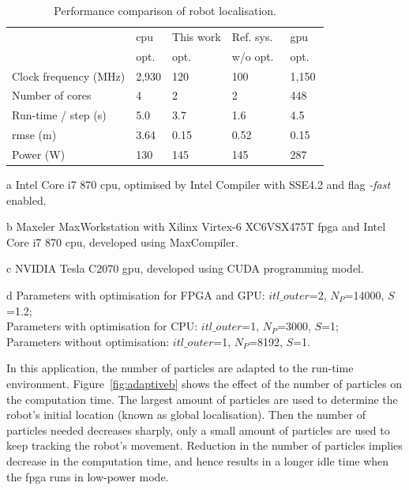 \begin{table}[ht]
	\setlength{\tabcolsep}{2pt}
	\begin{spacing}{1.0}
	\caption{Performance comparison of robot localisation.}
	\label{tab:perf_mcl1}
	\centering
	\smallskip
	\begin{threeparttable}
		\begin{tabular}{l|x{3cm}y{3cm}x{3cm}x{3cm}}
			\hline
															& \gls{cpu} 							& This work  				& Ref. sys.~\cite{chau14trets}  	& \gls{gpu} \\
															& opt.~		&	opt.~		& w/o opt.~		& opt. ~ \\
			\hline
			\hline
			Clock frequency (MHz) 	& 2,930 & 120 	& 100 	& 1,150 \\
			Number of cores					& 4		& 2 	& 2 	& 448 \\
			\hline
			\hline
			Run-time / step (s) 	& 5.0	& 3.7	& 1.6			& 4.5 \\
			\gls{rmse} (m)								& 3.64	& 0.15	& 0.52	& 0.15 \\
			Power (W)								& 130		& 145 	& 145		& 287 \\
			\hline
		\end{tabular}
		\begin{tablenotes}
		\item[a] Intel Core i7 870 \gls{cpu}, optimised by Intel Compiler with SSE4.2 and flag {\it -fast} enabled.
		\item[b] Maxeler MaxWorkstation with Xilinx Virtex-6 XC6VSX475T \gls{fpga} and Intel Core i7 870 \gls{cpu}, developed using MaxCompiler.
		\item[c] NVIDIA Tesla C2070 \gls{gpu}, developed using CUDA programming model.
		\item[d] Parameters with optimisation for FPGA and GPU: $itl\_outer$=2, $N_P$=14000, $S$=1.2; \\ Parameters with optimisation for CPU: $itl\_outer$=1, $N_P$=3000, $S$=1; \\ Parameters without optimisation: $itl\_outer$=1, $N_P$=8192, $S$=1. 
		\end{tablenotes}
	\end{threeparttable}
	\end{spacing}
\end{table}

In this application, the number of particles are adapted to the run-time environment.
Figure~\ref{fig:adaptiveb} shows the effect of the number of particles on the computation time.
The largest amount of particles are used to determine the robot's initial location (known as global localisation).
Then the number of particles needed decreases sharply, only a small amount of particles are used to keep tracking the robot's movement.
Reduction in the number of particles implies decrease in the computation time, and hence results in a longer idle time when the \gls{fpga} runs in low-power mode.


